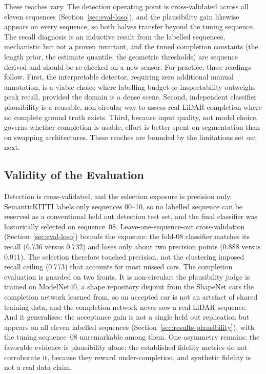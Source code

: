 \documentclass[a4paper,12pt]{report}
\begin{document}
These reaches vary. The detection operating point is cross-validated across all eleven
sequences (Section~\ref{sec:eval-loso}), and the plausibility gain likewise appears on every
sequence, so both halves transfer beyond the tuning sequence. The recall diagnosis is an
inductive result from the labelled sequences, mechanistic but not a proven invariant, and the
tuned completion constants (the length prior, the estimate quantile, the geometric
thresholds) are sequence derived and should be re-checked on a new sensor. For practice, three
readings follow. First, the interpretable detector, requiring zero additional manual
annotation, is a viable choice where labelling budget or inspectability outweighs peak
recall, provided the domain is a dense scene. Second, independent classifier plausibility is
a reusable, non-circular way to assess real LiDAR completion where no complete ground truth
exists. Third, because input quality, not model choice, governs whether completion is usable,
effort is better spent on segmentation than on swapping architectures. These reaches are bounded by the limitations set out next.

\subsection{Validity of the Evaluation}
\label{sec:disc-eval-validity}

Detection is cross-validated, and the selection exposure is precision only. SemanticKITTI
labels only sequences \numrange{00}{10}, so no labelled sequence can be reserved as a
conventional held out detection test set, and the final classifier was historically selected
on sequence~08. Leave-one-sequence-out cross-validation (Section~\ref{sec:eval-loso}) bounds
the exposure: the fold-08 classifier matches its recall (\num{0.736} versus \num{0.732}) and
loses only about two precision points (\num{0.888} versus \num{0.911}). The selection
therefore touched precision, not the clustering imposed recall ceiling (\num{0.773}) that accounts for
most missed cars. The completion evaluation is guarded on two fronts. It is
non-circular: the plausibility judge is trained on ModelNet40, a shape repository
disjoint from the ShapeNet cars the completion network learned from, so an accepted car is not
an artefact of shared training data, and the completion network never saw a real LiDAR
sequence. And it generalises: the acceptance gain is not a single held out replication
but appears on all eleven labelled sequences (Section~\ref{sec:results-plausibility}), with
the tuning sequence~08 unremarkable among them. One asymmetry remains: the favorable
evidence is plausibility alone; the established fidelity metrics do not corroborate it,
because they reward under-completion, and synthetic fidelity is not a real data claim.
\end{document}
